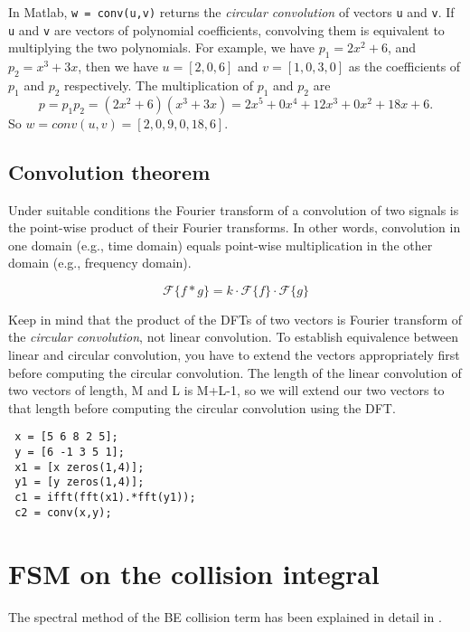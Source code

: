 \documentclass[11pt]{amsart}
\begin{document}
In Matlab, \verb|w = conv(u,v)| returns the \emph{circular convolution} of vectors \verb|u| and \verb|v|. If  \verb|u| and \verb|v| are vectors of polynomial coefficients, convolving them is equivalent to multiplying the two polynomials. For example, we have $p_1 = 2x^2 + 6$, and $p_2 = x^3 + 3x$, then we have $ u = [2, 0, 6]$ and $v = [1, 0,3,0]$ as the coefficients of $p_1$ and $p_2$ respectively. The multiplication of $p_1$ and $p_2$ are 
\begin{equation}
p = p_1 p_2 = (2x^2 + 6) (x^3 + 3x) = 2x^5 + 0 x^4 + 12 x^3 + 0x^2 + 18 x + 6.
\end{equation}
So $w = conv(u,v) =  [2,0,9,0,18,6]$.

\subsection{Convolution theorem} Under suitable conditions the Fourier transform of a convolution of two signals is the point-wise product of their Fourier transforms. In other words, convolution in one domain (e.g., time domain) equals point-wise multiplication in the other domain (e.g., frequency domain). 

\begin{equation}
\mathcal{F}\{f*g\}  =  k \cdot \mathcal{F}\{f\} \cdot  \mathcal{F}\{g\}
\end{equation}


Keep in mind that the product of the DFTs of two vectors is Fourier transform of the \emph{circular convolution}, not linear convolution. To establish equivalence between linear and circular convolution, you have to extend the vectors appropriately first before computing the circular convolution. The length of the linear convolution of two vectors of length, M and L is M+L-1, so we will extend our two vectors to that length before computing the circular convolution using the DFT.
 
 \begin{lstlisting}
 x = [5 6 8 2 5]; 
 y = [6 -1 3 5 1];
 x1 = [x zeros(1,4)];
 y1 = [y zeros(1,4)];
 c1 = ifft(fft(x1).*fft(y1));
 c2 = conv(x,y);
 \end{lstlisting}

 \section{FSM on the collision integral}
The spectral method of the BE collision term has been explained in detail in 
 \cite{pareschiNumericalSolutionBoltzmann2000}.
 
\end{document}

